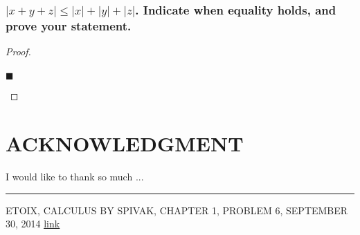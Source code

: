 \documentclass[letterpaper, 10 pt, conference]{ieeeconf}  %
\begin{document}
\subsubsection{\textbf{$\left\lvert x + y + z \right\rvert \leq \left\lvert x \right\rvert + \left\lvert y \right\rvert + \left\lvert z \right\rvert$. Indicate when equality holds, and prove your statement.}}
\begin{proof}
\begin{align}
    
\end{align}
\begin{flushright}
$\blacksquare$
\end{flushright}
\end{proof}

\newpage

\section*{ACKNOWLEDGMENT}
I would like to thank so much ...

\noindent\rule{8cm}{0.4pt}

\begin{thebibliography}{99}

 ETOIX, CALCULUS BY SPIVAK, CHAPTER 1, PROBLEM 6, SEPTEMBER 30, 2014 \href{https://etoix.wordpress.com/2014/09/30/calculus-by-spivak-chapter-1-problem-6/}{\underline{link}}
\end{thebibliography}
\end{document}
